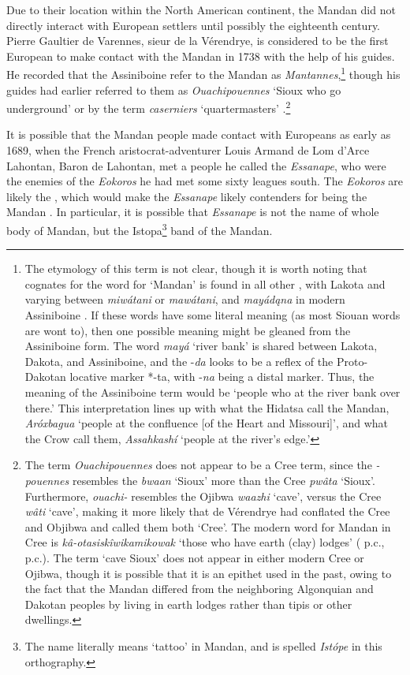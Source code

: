 Due to their location within the North American continent, the Mandan did not directly interact with European settlers until possibly the eighteenth century. Pierre Gaultier de Varennes, sieur de la Vérendrye, is considered to be the first European to make contact with the Mandan in 1738 with the help of his  guides. He recorded that the Assiniboine refer to the Mandan as \textit{Mantannes},\footnote{The etymology of this term is not clear, though it is worth noting that cognates for the word for `Mandan' is found in all other , with Lakota and  varying between \textit{miwátani} or \textit{mawátani}, and \textit{mayádąna} in modern Assiniboine \citep{parksdemallie2002}. If these words have some literal meaning (as most Siouan words are wont to), then one possible meaning might be gleaned from the Assiniboine form. The word \textit{mayá} `river bank' is shared between Lakota, Dakota, and Assiniboine, and the -\textit{da} looks to be a reflex of the Proto-Dakotan locative marker *-ta, with -\textit{na} being a distal marker. Thus, the meaning of the Assiniboine term would be `people who at the river bank over there.' This interpretation lines up with what the Hidatsa call the Mandan, \textit{Aróxbagua} `people at the confluence [of the Heart and Missouri]', and what the Crow call them, \textit{Assahkashí} `people at the river's edge.'} though his  guides had earlier referred to them as \textit{Ouachipouennes} `Sioux who go underground' or by the  term \textit{caserniers} `quartermasters' \citep[213]{mapp2013}.\footnote{The term \textit{Ouachipouennes} does not appear to be a Cree term, since the \textit{-pouennes} resembles the  \textit{bwaan} `Sioux' more than the Cree \textit{pwâta} `Sioux'. Furthermore, \textit{ouachi-} resembles the Ojibwa \textit{waazhi} `cave', versus the Cree \textit{wâti} `cave', making it more likely that de Vérendrye had conflated the Cree and Objibwa and called them both `Cree'. The modern word for Mandan in Cree is \textit{kâ-otasiskîwikamikowak} `those who have earth (clay) lodges' ( p.c.,  p.c.). The term `cave Sioux' does not appear in either modern Cree or Ojibwa, though it is possible that it is an epithet used in the past, owing to the fact that the Mandan differed from the neighboring Algonquian and Dakotan peoples by living in earth lodges rather than tipis or other dwellings.}

It is possible that the Mandan people made contact with Europeans as early as 1689, when the French aristocrat-adventurer Louis Armand de Lom d'Arce Lahontan, Baron de Lahontan, met a people he called the \textit{Essanape}, who were the enemies of the \textit{Eokoros} he had met some sixty leagues south. The \textit{Eokoros} are likely the , which would make the \textit{Essanape} likely contenders for being the Mandan \citep[28]{fenn2015}. In particular, it is possible that \textit{Essanape} is not the name of whole body of Mandan, but the Istopa\footnote{The name literally means `tattoo' in Mandan, and is spelled \textit{Istópe} in this orthography.} band of the Mandan.

